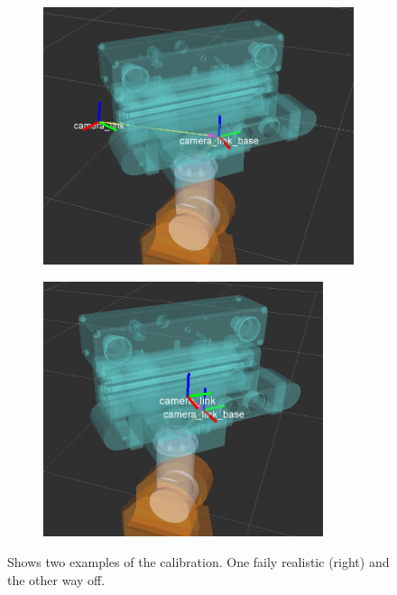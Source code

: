 \begin{figure}[htb]
	\centering
        \begin{subfigure}[b]{0.4\textwidth}
        		\begin{center}
				\includegraphics[width=\textwidth]{graphics/08_resultsdiscussion/calibration_result_rviz1.png}
			\end{center}
        \end{subfigure}
        \begin{subfigure}[b]{0.4\textwidth}
        \begin{center}
			\includegraphics[width=0.9\textwidth]{graphics/08_resultsdiscussion/calibration_result_rviz2.png}
			\end{center}
        \end{subfigure} 
		\caption{Shows two examples of the calibration. One faily realistic (right) and the other way off.}\label{fig:calibration_tf}
\end{figure}


